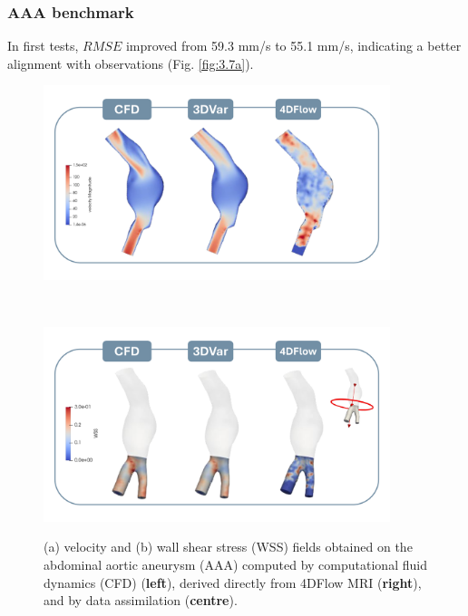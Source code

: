 \subsubsection*{AAA benchmark}
In first tests, \(RMSE\) improved from 59.3 mm/s to 55.1 mm/s, indicating a better alignment with observations (Fig. \ref{fig:3.7a}). 
\begin{figure}
    \centering
    \begin{minipage}{\textwidth}
        \centering
        \includegraphics[width=0.9\textwidth]{chapters/paratico/Fig1.3a.pdf}
        \label{fig:3.7a}
    \end{minipage}
    \\[1em]  
    \begin{minipage}{\textwidth}
        \centering
        \includegraphics[width=0.9\textwidth]{chapters/paratico/Fig1.3b.pdf}
        \label{fig:3.7b}
    \end{minipage}
    \caption{\small (a) velocity and (b) wall shear stress (WSS) fields obtained on the abdominal aortic aneurysm (AAA) computed by computational fluid dynamics (CFD) (\textbf{left}), derived directly from 4DFlow MRI (\textbf{right}), and by  data assimilation (\textbf{centre}).}
    \label{fig:3.7}
\end{figure}

